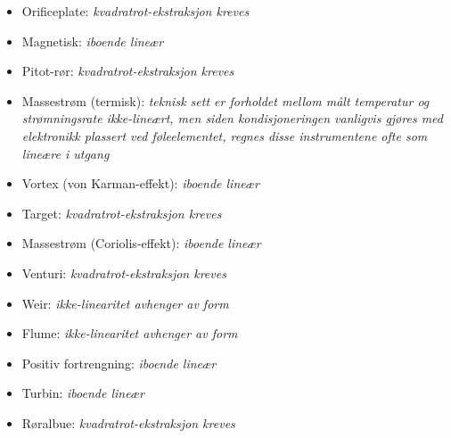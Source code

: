 \begin{itemize}
\item{} Orificeplate: {\it kvadratrot-ekstraksjon kreves}
\vskip 5pt
\item{} Magnetisk: {\it iboende lineær}
\vskip 5pt
\item{} Pitot-rør: {\it kvadratrot-ekstraksjon kreves}
\vskip 5pt
\item{} Massestrøm (termisk): {\it teknisk sett er forholdet mellom målt temperatur og strømningsrate ikke-lineært, men siden kondisjoneringen vanligvis gjøres med elektronikk plassert ved føleelementet, regnes disse instrumentene ofte som lineære i utgang}
\vskip 5pt
\item{} Vortex (von Karman-effekt): {\it iboende lineær}
\vskip 5pt
\item{} Target: {\it kvadratrot-ekstraksjon kreves}
\vskip 5pt
\item{} Massestrøm (Coriolis-effekt): {\it iboende lineær}
\vskip 5pt
\item{} Venturi: {\it kvadratrot-ekstraksjon kreves}
\vskip 5pt
\item{} Weir: {\it ikke-linearitet avhenger av form}
\vskip 5pt
\item{} Flume: {\it ikke-linearitet avhenger av form}
\vskip 5pt
\item{} Positiv fortrengning: {\it iboende lineær}
\vskip 5pt
\item{} Turbin: {\it iboende lineær}
\vskip 5pt
\item{} Røralbue: {\it kvadratrot-ekstraksjon kreves}
\end{itemize}


